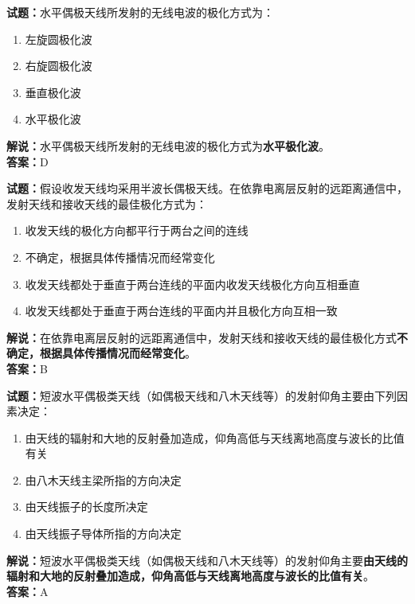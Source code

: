 \documentclass{ctexbook}
\begin{document}
\textbf{试题：}水平偶极天线所发射的无线电波的极化方式为：
\begin{enumerate}[leftmargin=3em]
  \item 左旋圆极化波
  \item 右旋圆极化波
  \item 垂直极化波
  \item 水平极化波
\end{enumerate}
\noindent\textbf{解说：}水平偶极天线所发射的无线电波的极化方式为\textbf{水平极化波}。\\\noindent\textbf{答案：}D

\vspace{1em}

\textbf{试题：}假设收发天线均采用半波长偶极天线。在依靠电离层反射的远距离通信中，发射天线和接收天线的最佳极化方式为：
\begin{enumerate}[leftmargin=3em]
  \item 收发天线的极化方向都平行于两台之间的连线
  \item 不确定，根据具体传播情况而经常变化
  \item 收发天线都处于垂直于两台连线的平面内收发天线极化方向互相垂直
  \item 收发天线都处于垂直于两台连线的平面内并且极化方向互相一致
\end{enumerate}
\noindent\textbf{解说：}在依靠电离层反射的远距离通信中，发射天线和接收天线的最佳极化方式\textbf{不确定，根据具体传播情况而经常变化}。\\\noindent\textbf{答案：}B

\vspace{1em}

\textbf{试题：}短波水平偶极类天线（如偶极天线和八木天线等）的发射仰角主要由下列因素决定：
\begin{enumerate}[leftmargin=3em]
  \item 由天线的辐射和大地的反射叠加造成，仰角高低与天线离地高度与波长的比值有关
  \item 由八木天线主梁所指的方向决定
  \item 由天线振子的长度所决定
  \item 由天线振子导体所指的方向决定
\end{enumerate}
\noindent\textbf{解说：}短波水平偶极类天线（如偶极天线和八木天线等）的发射仰角主要\textbf{由天线的辐射和大地的反射叠加造成，仰角高低与天线离地高度与波长的比值有关}。\\\noindent\textbf{答案：}A

\vspace{1em}
\end{document}
